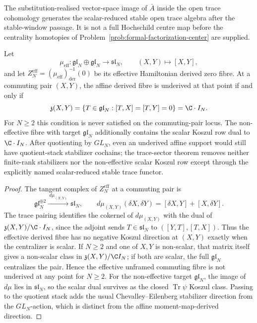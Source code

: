 \documentclass[11pt]{memoir}
\begin{document}
The substitution-realised vector-space image of \(\bar A\) inside the
open trace cohomology generates the scalar-reduced stable open trace
algebra after the stable-window passage.  It is not a full Hochschild
centre map before the centrality homotopies of
Problem~\ref{prob:formal-factorization-center} are supplied.

\begin{lem}\label{lem:unframed-commuting-underived-criterion}
  Let
  \[
    \mu_{\mathrm{eff}}\colon
    \mathfrak{gl}_N\oplus\mathfrak{gl}_N\longrightarrow\mathfrak{sl}_N,
    \qquad
    (X,Y)\longmapsto [X,Y],
  \]
  and let \(Z^{\mathrm{eff}}_N=(\mu_{\mathrm{eff}})^{-1}_{\mathrm{der}}(0)\)
  be its effective Hamiltonian derived zero fibre.  At a commuting pair
  \((X,Y)\), the affine derived fibre is underived at that point if and
  only if
  \[
    \mathfrak z(X,Y)=\{T\in\mathfrak{gl}_N:[T,X]=[T,Y]=0\}
    =\C\cdot I_N .
  \]
  For \(N\ge2\) this condition is never satisfied on the commuting-pair
  locus.  The non-effective fibre with target \(\mathfrak{gl}_N\)
  additionally contains the scalar Koszul row dual to
  \(\C\cdot I_N\).  After quotienting by \(GL_N\), even an underived
  affine support would still have quotient-stack stabilizer cochains; the
  trace-sector theorem removes neither finite-rank stabilizers nor the
  non-effective scalar Koszul row except through the explicitly named
  scalar-reduced stable trace functor.
\end{lem}

\begin{proof}
  The tangent complex of \(Z^{\mathrm{eff}}_N\) at a commuting pair is
  \[
    \mathfrak{gl}_N^{\oplus2}
      \xrightarrow{\ d\mu_{(X,Y)}\ }
    \mathfrak{sl}_N,
    \qquad
    d\mu_{(X,Y)}(\delta X,\delta Y)
      =
      [\delta X,Y]+[X,\delta Y].
  \]
  The trace pairing identifies the cokernel of
  \(d\mu_{(X,Y)}\) with the dual of
  \(\mathfrak z(X,Y)/\C\cdot I_N\), since the adjoint sends
  \(T\in\mathfrak{sl}_N\) to \(([Y,T],[T,X])\).  Thus the effective
  derived fibre has no negative Koszul direction at \((X,Y)\) exactly
  when the centralizer is scalar.  If \(N\ge2\) and one of \(X,Y\) is
  non-scalar, that matrix itself gives a non-scalar class in
  \(\mathfrak z(X,Y)/\C I_N\); if both are scalar, the full
  \(\mathfrak{gl}_N\) centralizes the pair.  Hence the effective
  unframed commuting fibre is not underived at any point for \(N\ge2\).
  For the non-effective target \(\mathfrak{gl}_N\), the image of
  \(d\mu\) lies in \(\mathfrak{sl}_N\), so the scalar dual survives as
  the closed \(\operatorname{Tr}\psi\) Koszul class.  Passing to the
  quotient stack adds the usual Chevalley--Eilenberg stabilizer direction
  from the \(GL_N\)-action, which is distinct from the affine
  moment-map-derived direction.
\end{proof}
\end{document}
